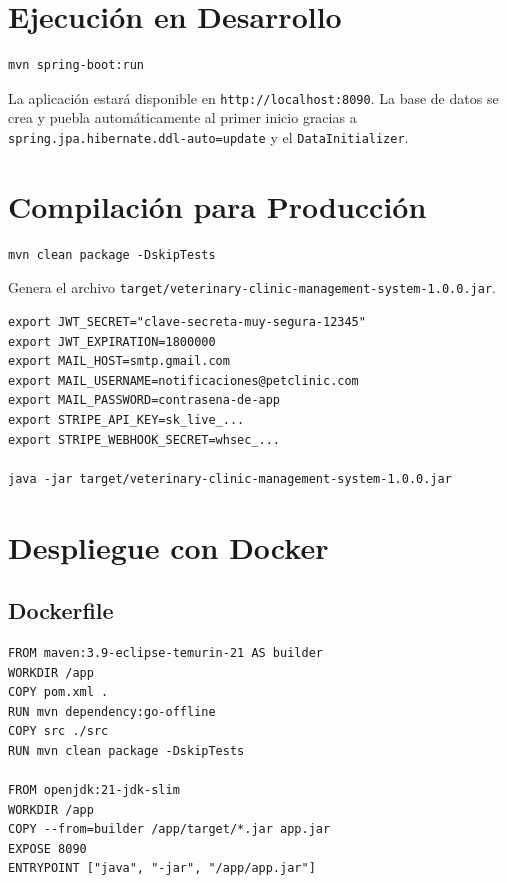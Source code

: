 \section{Ejecuci\'on en Desarrollo}

\begin{lstlisting}[caption=Ejecutar la aplicaci\'on en modo desarrollo]
mvn spring-boot:run
\end{lstlisting}

La aplicaci\'on estar\'a disponible en \texttt{http://localhost:8090}. La base de datos se crea y puebla autom\'aticamente al primer inicio gracias a \texttt{spring.jpa.hibernate.ddl-auto=update} y el \texttt{DataInitializer}.

\section{Compilaci\'on para Producci\'on}

\begin{lstlisting}[caption=Compilar y empaquetar como JAR]
mvn clean package -DskipTests
\end{lstlisting}

Genera el archivo \texttt{target/veterinary-clinic-management-system-1.0.0.jar}.

\begin{lstlisting}[caption=Ejecutar JAR compilado con variables de entorno]
export JWT_SECRET="clave-secreta-muy-segura-12345"
export JWT_EXPIRATION=1800000
export MAIL_HOST=smtp.gmail.com
export MAIL_USERNAME=notificaciones@petclinic.com
export MAIL_PASSWORD=contrasena-de-app
export STRIPE_API_KEY=sk_live_...
export STRIPE_WEBHOOK_SECRET=whsec_...

java -jar target/veterinary-clinic-management-system-1.0.0.jar
\end{lstlisting}

\section{Despliegue con Docker}

\subsection{Dockerfile}

\begin{lstlisting}[caption=Dockerfile multi-etapa para imagen optimizada]
FROM maven:3.9-eclipse-temurin-21 AS builder
WORKDIR /app
COPY pom.xml .
RUN mvn dependency:go-offline
COPY src ./src
RUN mvn clean package -DskipTests

FROM openjdk:21-jdk-slim
WORKDIR /app
COPY --from=builder /app/target/*.jar app.jar
EXPOSE 8090
ENTRYPOINT ["java", "-jar", "/app/app.jar"]
\end{lstlisting}

